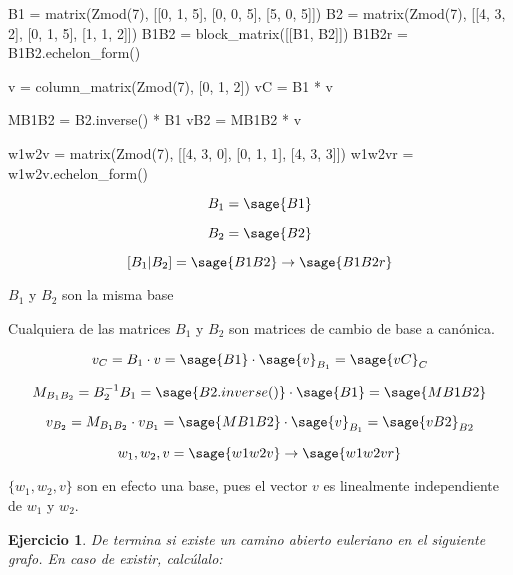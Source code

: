 \documentclass{amsart}
\newtheorem{ejer}{Ejercicio}
\begin{document}

\begin{sageblock}
	B1 = matrix(Zmod(7), [[0, 1, 5], [0, 0, 5], [5, 0, 5]])
	B2 = matrix(Zmod(7), [[4, 3, 2], [0, 1, 5], [1, 1, 2]])
	B1B2 = block_matrix([[B1, B2]])
	B1B2r = B1B2.echelon_form()
	
	v = column_matrix(Zmod(7), [0, 1, 2])
	vC = B1 * v
	
	MB1B2 = B2.inverse() * B1
	vB2 = MB1B2 * v
	
	w1w2v = matrix(Zmod(7), [[4, 3, 0], [0, 1, 1], [4, 3, 3]])
	w1w2vr = w1w2v.echelon_form()
	
\end{sageblock}

$$
	B_1 = \sage{B1}
$$

$$
	B_2 = \sage{B2}
$$

$$
	[B_1|B_2] = \sage{B1B2} \to \sage{B1B2r}
$$

$B_1$ y $B_2$ son la misma base

Cualquiera de las matrices $B_1$ y $B_2$ son matrices de cambio de base a canónica.

$$
	v_{C} = B_1 \cdot v = \sage{B1} \cdot {\sage{v}}_{B_1} = {\sage{vC}}_C
$$

$$
	M_{B_1B_2} = B_2^{-1} B_1 = \sage{B2.inverse()} \cdot \sage{B1} = \sage{MB1B2}
$$

$$
	v_{B_2} = M_{B_1B_2} \cdot v_{B_1} = \sage{MB1B2} \cdot {\sage{v}}_{B_1} = {\sage{vB2}}_{B2}
$$

$$
	{w_1,w_2,v} = \sage{w1w2v} \to \sage{w1w2vr}
$$

$\{w_1,w_2,v\}$ son en efecto una base, pues el vector $v$ es linealmente independiente de $w_1$ y $w_2$.


\begin{ejer}
De termina si existe un camino abierto euleriano en el siguiente
grafo. En caso de existir, calcúlalo:

\begin{center}
\end{center}
\end{ejer}
\end{document}
